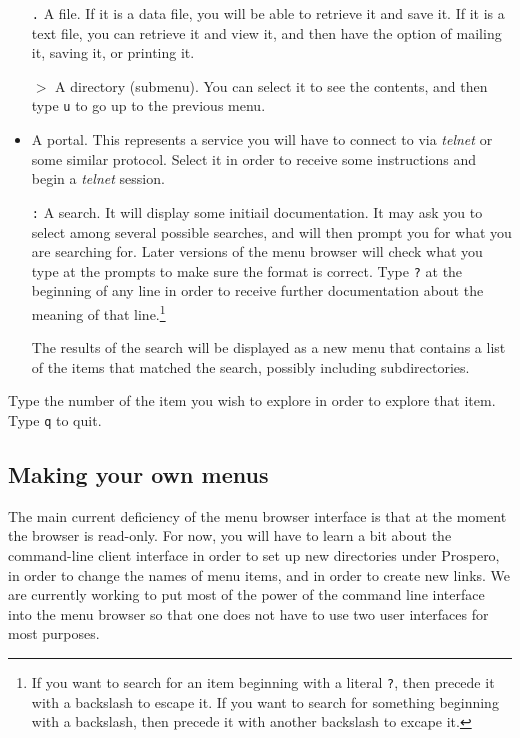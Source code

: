 \begin{itemize}

\item[{\tt .}]  A file.  If it is a data file, you will be able to retrieve
it and save it.  If it is a text file, you can retrieve it and view
it, and then have the option of mailing it, saving it, or printing it.

\item[{\tt $>$}] A directory (submenu).  You can select it to see the
contents, and then type {\tt u} to go up to the previous menu.

\item[{\tt \verb"]"}]  A portal.  This represents a service you will have to
connect to via {\em telnet} or some similar protocol.  Select it in
order to receive some instructions and begin a {\em telnet} session.

\item[{\tt :}] A search.   It will display some initiail documentation.  It may
ask you to select among several possible searches, and will then
prompt you for what you are searching for.  Later versions of the menu
browser will check what you type at the prompts to make sure the
format is correct.  Type {\tt ?} at the
beginning of any line in order to receive further documentation  about
the meaning of that line.\footnote{If you want to search for an item
beginning with a literal {\tt ?}, then precede it with a backslash to
escape it. %
If you want to search for something beginning with a backslash, then precede it with
another backslash to excape it.
}

The results of the search will be displayed as a new menu that
contains a list of the items that matched the search, possibly
including subdirectories.
\end{itemize}

Type the number of the item you wish to explore in order to explore
that item.  Type {\tt q} to quit.

\subsection{Making your own menus}

The main current deficiency of the menu browser interface is that at
the moment the browser is read-only.  For now, you will have to learn
a bit about the command-line client interface in order to set up new
directories under Prospero, in order to change the names of menu
items, and in order to create new links.  We are currently working to
put most of the power of the command line interface into the menu
browser so that one does not have to use two user interfaces for most
purposes. 

